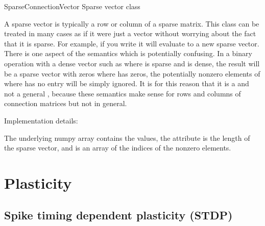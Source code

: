 \documentclass[letterpaper,10pt,english]{manual}
\begin{document}
\hypertarget{brian.SparseConnectionVector}{}\begin{classdesc}{SparseConnectionVector}{}
Sparse vector class

A sparse vector is typically a row or column of a sparse matrix. This
class can be treated in many cases as if it were just a vector without
worrying about the fact that it is sparse. For example, if you write
 it will evaluate to a new sparse vector. There is one aspect
of the semantics which is potentially confusing. In a binary operation
with a dense vector such as  where  is sparse and 
is dense, the result will be a sparse vector with zeros where 
has zeros, the potentially nonzero elements of  where  has
no entry will be simply ignored. It is for this reason that it is a
 and not a general , because
these semantics make sense for rows and columns of connection matrices
but not in general.

Implementation details:

The underlying numpy array contains the values, the attribute  is
the length of the sparse vector, and  is an array of the indices
of the nonzero elements.
\end{classdesc}

\resetcurrentobjects


\section{Plasticity}


\subsection{Spike timing dependent plasticity (STDP)}
\end{document}
